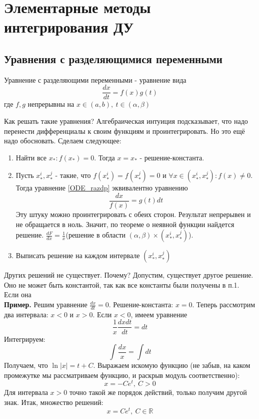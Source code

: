 \section{Элементарные методы интегрирования ДУ}
\subsection{Уравнения с разделяющимися переменными}
\begin{defin}\label{ODE_razdp}
Уравнение с разделяющими переменными - уравнение вида
\begin{equation}
    \frac{dx}{dt}=f(x)g(t) 
\end{equation}
где $f,g$ непрерывны на  $x\in(a,b),~t\in(\alpha,\beta)$
\end{defin}
Как решать такие уравнения? Алгебраическая интуиция подсказывает, что надо 
перенести 
дифференциалы к своим функциям и проинтегрировать. Но это ещё надо обосновать.
Сделаем следующее:\\
\begin{enumerate}
    \item Найти все $x_*:f(x_*)=0$. Тогда $x=x_*$ - решение-константа. 
    \item Пусть  $x^i_*,x^j_*$ - такие, что  $f(x^i_*)=f(x^j_*)=0$ и
    $\forall x\in(x^i_*,x^j_*):f(x)\ne0$. Тогда уравнение \ref{ODE_razdp}
эквивалентно уравнению 
$$\frac{dx}{f(x)}=g(t)dt$$
Эту штуку можно проинтегрировать с обеих сторон. Результат непрерывен и не
обращается в ноль. Значит, по теореме о неявной функции найдется решение. 
$\frac{dF}{dx}=\frac{1}{x}$(решение в области $(\alpha,\beta)\times
(x^i_*,x^j_*)$).
    \item Выписать решение на каждом интервале $(x^i_*,x^j_*)$
\end{enumerate}
Других решений не существует. Почему? Допустим, существует другое решение.
Оно не может быть константой, так как все константы были получены в п.1.
Если она \\
\textbf{Пример.} Решим уравнение $\frac{dx}{dt}=0$. Решение-константа: $x=0$.
Теперь рассмотрим два интервала: $x<0$ и  $x>0$. Если  $x<0$, имеем уравнение
 $$\frac{1}{x}\frac{dxdt}{dt}=dt$$
 Интегрируем:
 $$\int\frac{dx}{x}=\int dt$$
 Получаем, что $\ln|x|=t+C$. Выражаем искомую функцию (не забыв, на каком
 промежутке мы рассматриваем функцию, и раскрыв модуль соответственно):
 $$x=-Ce^t,~C>0$$
Для интервала $x>0$ точно такой же порядок действий, только получим другой 
знак. Итак, множество решений:
$$x=Ce^t,~C\in\mathbb{R}$$
